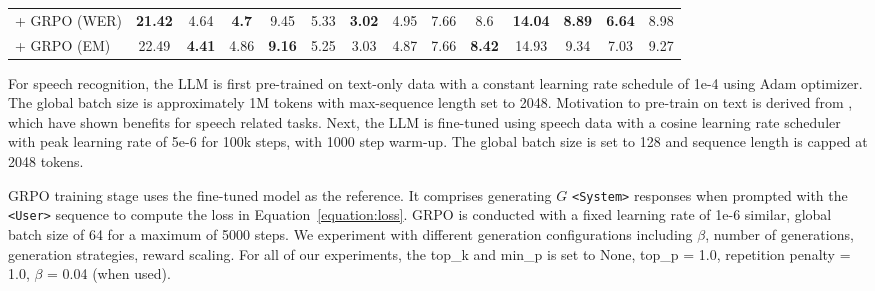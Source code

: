 \documentclass[conference]{IEEEtran}
\begin{document}
\begin{table}[!t]
\begin{tabularx}{\textwidth}{@{} p{} C C C C C C C C C C C C C @{}}
          + GRPO (WER) & \textbf{21.42} & 4.64 & \textbf{4.7} & 9.45 & 5.33 & \textbf{3.02} & 4.95 & 7.66 & 8.6 & \textbf{14.04} & \textbf{8.89} & \textbf{6.64} & 8.98 \\
          + GRPO (EM) & 22.49 & \textbf{4.41} & 4.86 & \textbf{9.16} & 5.25 & 3.03 & 4.87 & 7.66 & \textbf{8.42} & 14.93 & 9.34  & 7.03 & 9.27 \\
        \bottomrule
    \end{tabularx}
\end{table}

For speech recognition, the LLM is first pre-trained on text-only data with a constant learning rate schedule of 1e-4 using Adam optimizer.
The global batch size is approximately 1M tokens with max-sequence length set to 2048.
Motivation to pre-train on text is derived from \cite{hassid2024textually, nguyen2025spirit, maiti2024voxtlm}, which have shown benefits for speech related tasks.
Next, the LLM is fine-tuned using speech data with a cosine learning rate scheduler with peak learning rate of 5e-6 for 100k steps, with 1000 step warm-up.
The global batch size is set to 128 and sequence length is capped at 2048 tokens.

GRPO training stage uses the fine-tuned model as the reference.
It comprises generating $G$ \texttt{<System>} responses when prompted with the \texttt{<User>} sequence to compute the loss in Equation~\eqref{equation:loss}.
GRPO is conducted with a fixed learning rate of 1e-6 similar, global batch size of 64 for a maximum of 5000 steps.
We experiment with different generation configurations including $\beta$, number of generations, generation strategies, reward scaling.
For all of our experiments, the top\_k and min\_p is set to None, top\_p = 1.0, repetition penalty = 1.0, $\beta$ = 0.04 (when used).
\end{document}
